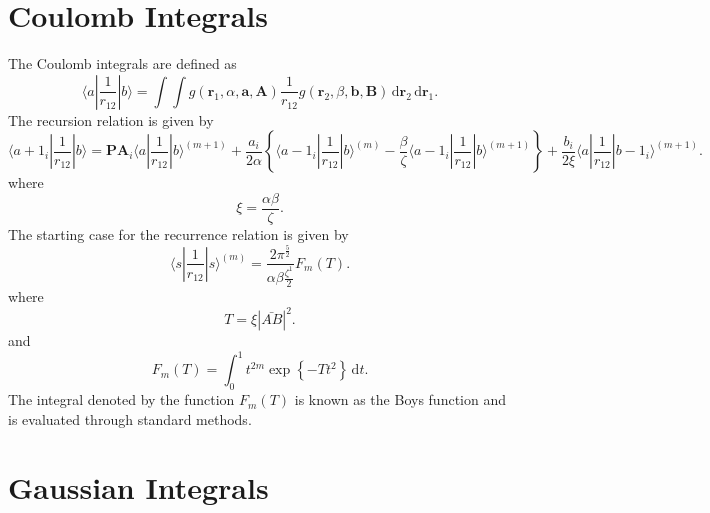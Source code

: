 \section{Coulomb Integrals}
The Coulomb integrals are defined as
\[
	\langle a | \frac{1}{r_{12}} | b \rangle = \int \int g(\boldsymbol{r}_1,\alpha,\boldsymbol{a},\boldsymbol{A}) \frac{1}{r_{12}} g(\boldsymbol{r}_2,\beta, \boldsymbol{b},\boldsymbol{B}) \, \mathrm{d}\boldsymbol{r}_2  \, \mathrm{d} \boldsymbol{r}_1 
.\] 
The recursion relation is given by
\[
	\langle a + 1_i | \frac{1}{r_{12}} | b \rangle = \boldsymbol{PA}_i \langle a | \frac{1}{r_{12}} | b \rangle ^{(m+1)} + \frac{a_i}{2\alpha} \left\{ \langle a-1_i | \frac{1}{r_{12}} | b \rangle ^{(m)} - \frac{\beta}{\zeta}\langle a - 1_i | \frac{1}{r_{12}} | b \rangle ^{(m+1)}\right\} + \frac{b_i}{2\xi} \langle a | \frac{1}{r_{12}} | b - 1_i \rangle ^{(m+1)} 
.\] 
where
\[
\xi = \frac{\alpha \beta}{\zeta}
.\] 
The starting case for the recurrence relation is given by
\[
	\langle s | \frac{1}{r_{12}} | s \rangle ^{(m)} = \frac{2\pi ^{\frac{5}{2}}}{\alpha \beta \frac{\zeta^1}{2}} F_m(T)
.\] 
where
\[
	T = \xi |\bar{AB} | ^2
.\] 
and 
\[
	F_m (T) = \int ^1_0 t^{2m} \exp \left\{ - T t^2 \right\}  \, \mathrm{d}t 
.\] 
The integral denoted by the function $F_m(T)$ is known as the Boys function and is evaluated through standard methods.

\section{Gaussian Integrals}


